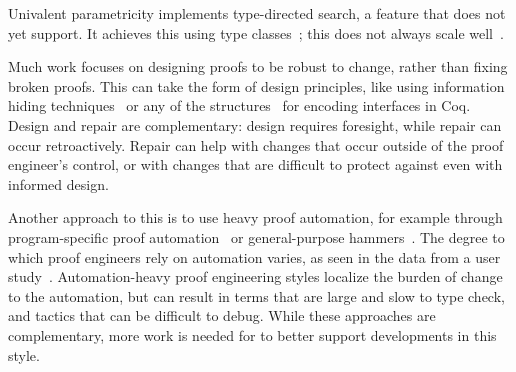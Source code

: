 Univalent parametricity implements type-directed search, a feature that \toolname does not yet support.
It achieves this using type classes~\cite{Sozeau2008}; this does not always scale well~\cite{tabareau2019marriage}.

Much work focuses on designing proofs
to be robust to change, rather than fixing broken proofs.
This can take the form of design principles, like using 
information hiding techniques~\cite{Woos:2016:PCF:2854065.2854081, Klein:2014:CFV:2584468.2560537}
or any of the structures~\cite{Chrzaszcz2003, Sozeau2008, Saibi:PhD} for encoding interfaces in Coq.
Design and repair are complementary: design requires foresight, while repair can occur retroactively.
Repair can help with changes that occur outside of the proof engineer's control,
or with changes that are difficult to protect against even with informed design.

Another approach to this is to use heavy proof automation, for example through
program-specific proof automation~\cite{Chlipala:2013:CPD:2584504}
or general-purpose hammers~\cite{Blanchette2016b, Blanchette2013, Kaliszyk2014, Czajka2018}.
The degree to which proof engineers rely on automation varies, as seen in the data from a user study~\cite{replica}.
Automation-heavy proof engineering styles localize the burden of change to the automation,
but can result in terms that are large and slow to type check,
and tactics that can be difficult to debug.
While these approaches are complementary, more work is needed for \toolname to better support 
developments in this style.



